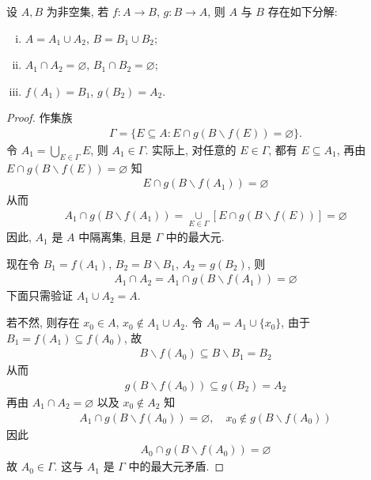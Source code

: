 \documentclass[../../main.tex]{subfiles}%
\begin{document}
\begin{lemma}[映射分解定理]\label{lemma:映射定义域与陪域的无交分解}
设 $A, B$ 为非空集, 若 $f : A \to B$, $g : B \to A$, 则 $A$ 与 $B$ 存在如下分解:
\begin{enumerate}[(i)]
\item $A = A_1 \cup A_2$, $B = B_1 \cup B_2$;
\item $A_1 \cap A_2 = \varnothing$, $B_1 \cap B_2 = \varnothing$;
\item $f(A_1) = B_1$, $g(B_2) = A_2$.
\end{enumerate}
\end{lemma}
\begin{proof}

作集族
\begin{align*}
\Gamma = \{E \subseteq A : E \cap g(B\backslash  f(E)) = \varnothing\}.
\end{align*}
令 $A_1 = \underset{E \in \Gamma}{\bigcup} E$, 则 $A_1 \in \Gamma$. 实际上, 对任意的 $E \in \Gamma$, 都有 $E \subseteq A_1$, 再由 $E \cap g(B\backslash  f(E)) = \varnothing$ 知
\begin{align*}
E \cap g(B\backslash  f(A_1)) = \varnothing
\end{align*}
从而
\begin{align*}
A_1 \cap g(B\backslash  f(A_1)) = \underset{E \in \Gamma}{\cup}[E \cap g(B\backslash  f(E))] = \varnothing
\end{align*}
因此, $A_1$ 是 $A$ 中隔离集, 且是 $\Gamma$ 中的最大元.

现在令 $B_1 = f(A_1)$, $B_2 = B\backslash  B_1$, $A_2 = g(B_2)$, 则
\begin{align*}
A_1 \cap A_2 = A_1 \cap g(B\backslash  f(A_1)) = \varnothing
\end{align*}
下面只需验证 $A_1 \cup A_2 = A$.

若不然, 则存在 $x_0 \in A$, $x_0 \notin A_1 \cup A_2$. 令 $A_0 = A_1 \cup \{x_0\}$, 由于 $B_1 = f(A_1) \subseteq f(A_0)$, 故
\begin{align*}
B\backslash  f(A_0) \subseteq B\backslash  B_1 = B_2
\end{align*}
从而
\begin{align*}
g(B\backslash  f(A_0)) \subseteq g(B_2) = A_2
\end{align*}
再由 $A_1 \cap A_2 = \varnothing$ 以及 $x_0 \notin A_2$ 知
\begin{align*}
A_1 \cap g(B\backslash  f(A_0)) = \varnothing, \quad x_0 \notin g(B\backslash  f(A_0))
\end{align*}
因此
\begin{align*}
A_0 \cap g(B\backslash  f(A_0)) = \varnothing
\end{align*}
故 $A_0 \in \Gamma$. 这与 $A_1$ 是 $\Gamma$ 中的最大元矛盾. 

\end{proof}
\end{document}
